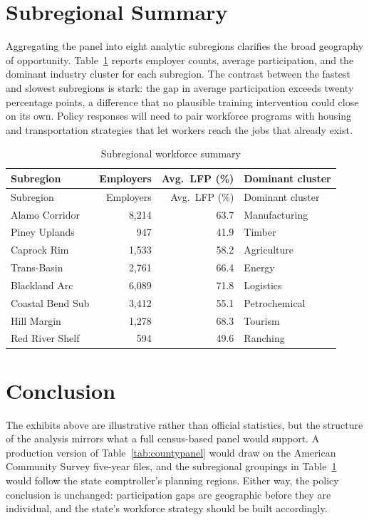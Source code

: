 \documentclass[11pt]{article}
\begin{document}
\section{Subregional Summary}

Aggregating the panel into eight analytic subregions clarifies the broad
geography of opportunity. Table~\ref{tab:subregions} reports employer counts,
average participation, and the dominant industry cluster for each subregion.
The contrast between the fastest and slowest subregions is stark: the gap in
average participation exceeds twenty percentage points, a difference that no
plausible training intervention could close on its own. Policy responses will
need to pair workforce programs with housing and transportation strategies
that let workers reach the jobs that already exist.

\begin{longtable}{lrrl}
\caption{Subregional workforce summary}\label{tab:subregions}\\
\toprule
Subregion & Employers & Avg.\ LFP (\%) & Dominant cluster \\
\midrule
\endfirsthead
\toprule
Subregion & Employers & Avg.\ LFP (\%) & Dominant cluster \\
\midrule
\endhead
\bottomrule
\endlastfoot
Alamo Corridor & 8,214 & 63.7 & Manufacturing \\
Piney Uplands & 947 & 41.9 & Timber \\
Caprock Rim & 1,533 & 58.2 & Agriculture \\
Trans-Basin & 2,761 & 66.4 & Energy \\
Blackland Arc & 6,089 & 71.8 & Logistics \\
Coastal Bend Sub & 3,412 & 55.1 & Petrochemical \\
Hill Margin & 1,278 & 68.3 & Tourism \\
Red River Shelf & 594 & 49.6 & Ranching \\
\end{longtable}

\section{Conclusion}

The exhibits above are illustrative rather than official statistics, but the
structure of the analysis mirrors what a full census-based panel would
support. A production version of Table~\ref{tab:countypanel} would draw on
the American Community Survey five-year files, and the subregional groupings
in Table~\ref{tab:subregions} would follow the state comptroller's planning
regions. Either way, the policy conclusion is unchanged: participation gaps
are geographic before they are individual, and the state's workforce strategy
should be built accordingly.
\end{document}

